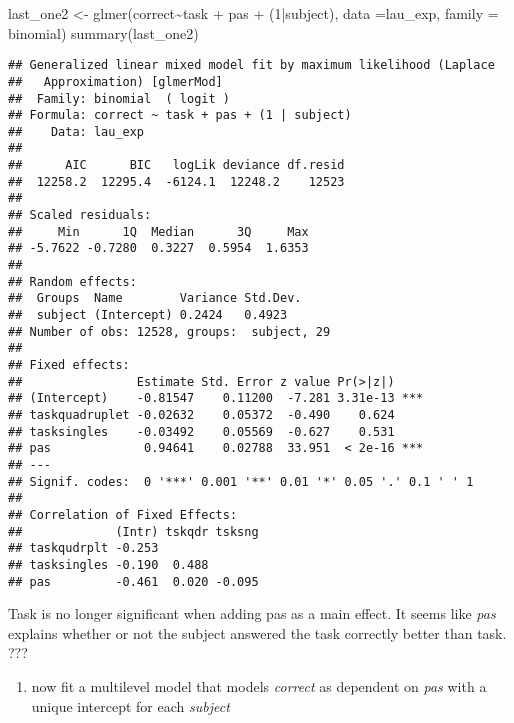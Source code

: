 \documentclass[
]{article}
\newenvironment{Shaded}{\begin{snugshade}}{\end{snugshade}}
\newcommand{\AttributeTok}[1]{\textcolor[rgb]{0.77,0.63,0.00}{#1}}
\newcommand{\DecValTok}[1]{\textcolor[rgb]{0.00,0.00,0.81}{#1}}
\newcommand{\FunctionTok}[1]{\textcolor[rgb]{0.00,0.00,0.00}{#1}}
\newcommand{\NormalTok}[1]{#1}
\newcommand{\OtherTok}[1]{\textcolor[rgb]{0.56,0.35,0.01}{#1}}
\newcommand{\SpecialCharTok}[1]{\textcolor[rgb]{0.00,0.00,0.00}{#1}}
\newcommand{\StringTok}[1]{\textcolor[rgb]{0.31,0.60,0.02}{#1}}
\providecommand{\tightlist}{%
  \setlength{\itemsep}{0pt}\setlength{\parskip}{0pt}}
\begin{document}
\begin{Shaded}
\begin{Highlighting}[]
\NormalTok{last\_one2 }\OtherTok{\textless{}{-}} \FunctionTok{glmer}\NormalTok{(correct}\SpecialCharTok{\textasciitilde{}}\NormalTok{task }\SpecialCharTok{+}\NormalTok{ pas }\SpecialCharTok{+}\NormalTok{ (}\DecValTok{1}\SpecialCharTok{|}\NormalTok{subject), }\AttributeTok{data =}\NormalTok{lau\_exp, }\AttributeTok{family =} \StringTok{\textquotesingle{}binomial\textquotesingle{}}\NormalTok{)}
\FunctionTok{summary}\NormalTok{(last\_one2)}
\end{Highlighting}
\end{Shaded}

\begin{verbatim}
## Generalized linear mixed model fit by maximum likelihood (Laplace
##   Approximation) [glmerMod]
##  Family: binomial  ( logit )
## Formula: correct ~ task + pas + (1 | subject)
##    Data: lau_exp
## 
##      AIC      BIC   logLik deviance df.resid 
##  12258.2  12295.4  -6124.1  12248.2    12523 
## 
## Scaled residuals: 
##     Min      1Q  Median      3Q     Max 
## -5.7622 -0.7280  0.3227  0.5954  1.6353 
## 
## Random effects:
##  Groups  Name        Variance Std.Dev.
##  subject (Intercept) 0.2424   0.4923  
## Number of obs: 12528, groups:  subject, 29
## 
## Fixed effects:
##                Estimate Std. Error z value Pr(>|z|)    
## (Intercept)    -0.81547    0.11200  -7.281 3.31e-13 ***
## taskquadruplet -0.02632    0.05372  -0.490    0.624    
## tasksingles    -0.03492    0.05569  -0.627    0.531    
## pas             0.94641    0.02788  33.951  < 2e-16 ***
## ---
## Signif. codes:  0 '***' 0.001 '**' 0.01 '*' 0.05 '.' 0.1 ' ' 1
## 
## Correlation of Fixed Effects:
##             (Intr) tskqdr tsksng
## taskqudrplt -0.253              
## tasksingles -0.190  0.488       
## pas         -0.461  0.020 -0.095
\end{verbatim}

Task is no longer significant when adding pas as a main effect. It seems
like \emph{pas} explains whether or not the subject answered the task
correctly better than task. ???

\begin{enumerate}
\def\labelenumi{\roman{enumi}.}
\setcounter{enumi}{2}
\tightlist
\item
  now fit a multilevel model that models \emph{correct} as dependent on
  \emph{pas} with a unique intercept for each \emph{subject}
\end{enumerate}
\end{document}
